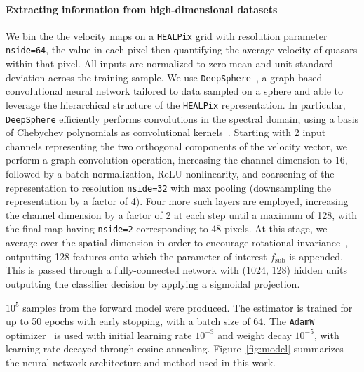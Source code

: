 \documentclass[]{article}
\begin{document}
\paragraph{Extracting information from high-dimensional datasets} We bin the the velocity maps on a \texttt{HEALPix} grid with resolution parameter \texttt{nside=64}, the value in each pixel then quantifying the average velocity of quasars within that pixel. All inputs are normalized to zero mean and unit standard deviation across the training sample. 
%
We use \texttt{DeepSphere}~\cite{2020arXiv201215000D,Perraudin:2018rbt}, a graph-based convolutional neural network tailored to data sampled on a sphere and able to leverage the hierarchical structure of the \texttt{HEALPix} representation. In particular, \texttt{DeepSphere} efficiently performs convolutions in the spectral domain, using a basis of Chebychev polynomials as convolutional kernels~\cite{2016arXiv160609375D}. Starting with 2 input channels representing the two orthogonal components of the velocity vector, we perform a graph convolution operation, increasing the channel dimension to 16, followed by a batch normalization, ReLU nonlinearity, and coarsening of the representation to resolution \texttt{nside=32} with max pooling (downsampling the representation by a factor of 4). 
Four more such layers are employed, increasing the channel dimension by a factor of 2 at each step until a maximum of 128, with the final map having \texttt{nside=2} corresponding to 48 pixels. At this stage, we average over the spatial dimension in order to encourage rotational invariance~\cite{lin2014network}, outputting 128 features onto which the parameter of interest $f_\mathrm{sub}$ is appended. This is passed through a fully-connected network with (1024, 128) hidden units outputting the classifier decision by applying a sigmoidal projection.  %

$10^5$ samples from the forward model were produced. The estimator is trained for up to 50 epochs with early stopping, with a batch size of 64. The \texttt{AdamW} optimizer~\cite{kingma2017adam,loshchilov2019decoupled} is used with initial learning rate $10^{-3}$ and weight decay $10^{-5}$, with learning rate decayed through cosine annealing. Figure~\ref{fig:model} summarizes the neural network architecture and method used in this work.

\end{document}
